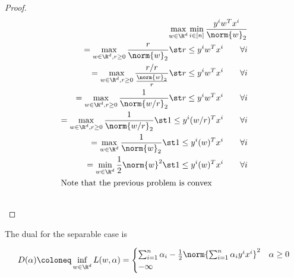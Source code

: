 \documentclass[../main.tex]{subfiles}
\begin{document}
\begin{proof}
    \begin{align*}
        \max_{w \in \R^d} \min_{i \in [n]} \frac{y^{i}w^Tx^{i}}{\norm{w}_2} \\
        = \max_{w \in \R^d, r \geq 0}  \frac{r}{\norm{w}_2} \st r \leq y^{i}w^Tx^{i}  \qquad \forall i \\
        = \max_{w \in \R^d, r \geq 0}  \frac{r/r}{\frac{\norm{w}_2}{r}} \st r \leq y^{i}w^Tx^{i}  \qquad \forall i \\
        = \max_{w \in \R^d, r \geq 0}  \frac{1}{\norm{w/r}_2} \st r \leq y^{i}w^Tx^{i}  \qquad \forall i \\
        = \max_{w \in \R^d, r \geq 0}  \frac{1}{\norm{w/r}_2} \st 1 \leq y^{i}(w/r)^Tx^{i}  \qquad \forall i \\
        = \max_{w \in \R^d}  \frac{1}{\norm{w}_2} \st 1 \leq y^{i}(w)^Tx^{i}  \qquad \forall i \\
        = \min_{w \in \R^d}  \frac{1}{2}\norm{w}^2 \st 1 \leq y^{i}(w)^Tx^{i}  \qquad \forall i \\
        \intertext{Note that the previous problem is convex} \\
    \end{align*}
\end{proof}


\begin{theorem}
    The dual for the separable case is

    \[
        D(\alpha) \coloneq \inf_{w \in \R^d} L(w, \alpha) = \begin{cases}
            \sum_{i=1}^{n}\alpha_i - \frac{1}{2}\norm{\sum_{i=1}^{n}\alpha_iy^{i}x^{i}}^2 & \alpha \geq 0 \\
            -\infty \\
        \end{cases}
    \]
\end{theorem}
\end{document}
